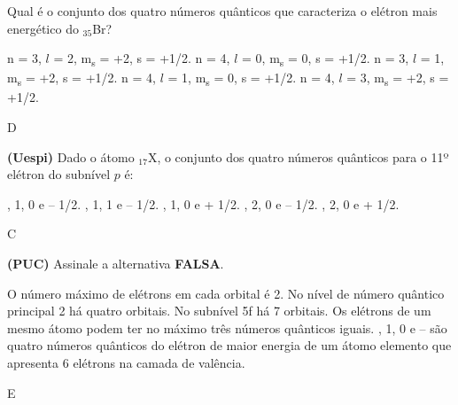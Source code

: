 \documentclass[9 pt]{scrartcl}
\def\PQ{0.84} %
\begin{document}
\begin{exercise}[points=\PQ]
Qual é o conjunto dos quatro números quânticos que caracteriza o elétron mais energético do  $_{35}$Br?
\begin{choice}
\choice n = 3, \(l\) = 2, m\textsubscript{s} = +2, s = +1/2.
\choice n = 4, \(l\) = 0, m\textsubscript{s} = 0, s = +1/2.
\choice n = 3, \(l\) = 1, m\textsubscript{s} = +2, s = +1/2.
\choice n = 4, \(l\) = 1, m\textsubscript{s} = 0, s = +1/2.
\choice n = 4, \(l\) = 3, m\textsubscript{s} = +2, s = +1/2. 
\end{choice}
\end{exercise}
\begin{solution}
D
\end{solution}



\begin{exercise}[points=\PQ]
\textbf{(Uespi)} Dado o átomo $_{17}$X, o conjunto dos quatro números quânticos para o 11º elétron do subnível \textbf{\(p\)} é:
\begin{choice}
, 1, 0 e – 1/2.
, 1, 1 e – 1/2.
, 1, 0 e + 1/2.
, 2, 0 e – 1/2.
, 2, 0 e + 1/2.
\end{choice}
\end{exercise}
\begin{solution}
C
\end{solution}






\begin{exercise}[points=\PQ]
\textbf{(PUC)} Assinale a alternativa \textbf{FALSA}.
\begin{choice}
\choice O número máximo de elétrons em cada orbital é 2.
\choice No nível de número quântico principal 2 há quatro orbitais.
\choice No subnível 5f há 7 orbitais.
\choice Os elétrons de um mesmo átomo podem ter no máximo três números quânticos iguais.
, 1, 0 e –   são quatro números quânticos do elétron de maior energia de um átomo elemento que apresenta 6 elétrons na camada de valência.
\end{choice}
\end{exercise}
\begin{solution}
E
\end{solution}
\end{document}
